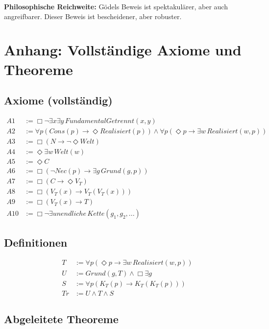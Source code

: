 \documentclass[
]{article}
\begin{document}
\textbf{Philosophische Reichweite:} Gödels Beweis ist spektakulärer, aber auch angreifbarer. Dieser Beweis ist bescheidener, aber robuster.

\section{Anhang: Vollständige Axiome und Theoreme}\label{anhang-vollstuxe4ndige-axiome-und-theoreme}

\subsection{Axiome (vollständig)}\label{axiome-vollstuxe4ndig}

\[
\begin{aligned}
A1 &:= \Box\neg\exists x\exists y\, FundamentalGetrennt(x,y) \\
A2 &:= \forall p(Cons(p) \rightarrow \Diamond Realisiert(p)) \land \forall p(\Diamond p \rightarrow \exists w\, Realisiert(w,p)) \\
A3 &:= \Box(N \rightarrow \neg\Diamond Welt) \\
A4 &:= \Diamond\exists w\, Welt(w) \\
A5 &:= \Diamond C \\
A6 &:= \Box(\neg Nec(p) \rightarrow \exists g\, Grund(g,p)) \\
A7 &:= \Box(C \rightarrow \Diamond V_T) \\
A8 &:= \Box(V_T(x) \rightarrow V_T(V_T(x))) \\
A9 &:= \Box(V_T(x) \rightarrow T) \\
A10 &:= \Box\neg\exists unendliche\, Kette(g_1, g_2, ...)
\end{aligned}
\]

\subsection{Definitionen}\label{definitionen}

\[
\begin{aligned}
T &:= \forall p(\Diamond p \rightarrow \exists w\, Realisiert(w,p)) \\
U &:= Grund(g, T) \land \Box \exists g \\
S &:= \forall p(K_T(p) \rightarrow K_T(K_T(p))) \\
Tr &:= U \land T \land S
\end{aligned}
\]

\subsection{Abgeleitete Theoreme}\label{abgeleitete-theoreme}
\end{document}
